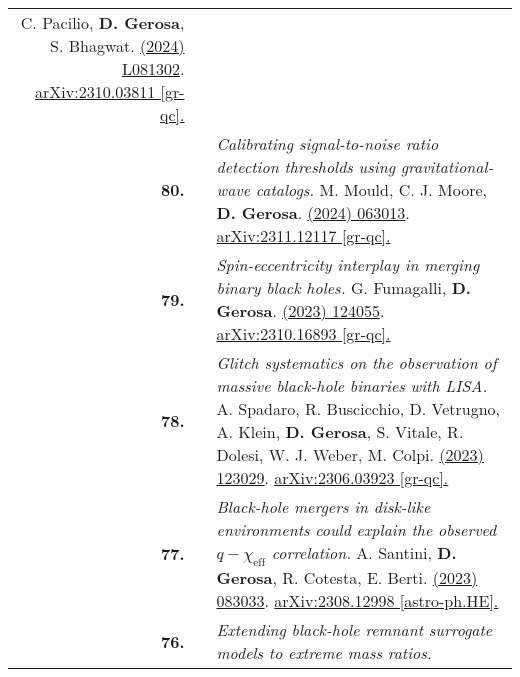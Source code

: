 {\begin{longtable}{rp{0.3cm}p{15.8cm}}
\newline{}
C. Pacilio, \textbf{D. Gerosa}, S. Bhagwat.
\newline{}
\href{https://journals.aps.org/prd/abstract/10.1103/PhysRevD.109.L081302}{\prdl 109 (2024) L081302}. \href{https://arxiv.org/abs/2310.03811}{arXiv:2310.03811 [gr-qc].}
\vspace{0.09cm}\\
%
\textbf{80.} & & \textit{Calibrating signal-to-noise ratio detection thresholds using gravitational-wave catalogs.}
\newline{}
M. Mould, C. J. Moore, \textbf{D. Gerosa}.
\newline{}
\href{https://journals.aps.org/prd/abstract/10.1103/PhysRevD.109.063013}{\prd 109 (2024) 063013}. \href{https://arxiv.org/abs/2311.12117}{arXiv:2311.12117 [gr-qc].}
\vspace{0.09cm}\\
%
\textbf{79.} & & \textit{Spin-eccentricity interplay in merging binary black holes.}
\newline{}
G. Fumagalli, \textbf{D. Gerosa}.
\newline{}
\href{https://journals.aps.org/prd/abstract/10.1103/PhysRevD.108.124055}{\prd 108 (2023) 124055}. \href{https://arxiv.org/abs/2310.16893}{arXiv:2310.16893 [gr-qc].}
\vspace{0.09cm}\\
%
\textbf{78.} & & \textit{Glitch systematics on the observation of massive black-hole binaries with LISA.}
\newline{}
A. Spadaro, R. Buscicchio, D. Vetrugno, A. Klein, \textbf{D. Gerosa}, S. Vitale, R. Dolesi, W. J. Weber, M. Colpi.
\newline{}
\href{https://journals.aps.org/prd/abstract/10.1103/PhysRevD.108.123029}{\prd 108 (2023) 123029}. \href{https://arxiv.org/abs/2306.03923}{arXiv:2306.03923 [gr-qc].}
\vspace{0.09cm}\\
%
\textbf{77.} & & \textit{Black-hole mergers in disk-like environments could explain the observed $q-\chi_\mathrm{eff}$ correlation.}
\newline{}
A. Santini, \textbf{D. Gerosa}, R. Cotesta, E. Berti.
\newline{}
\href{https://journals.aps.org/prd/abstract/10.1103/PhysRevD.108.083033}{\prd 108 (2023) 083033}. \href{https://arxiv.org/abs/2308.12998}{arXiv:2308.12998 [astro-ph.HE].}
\vspace{0.09cm}\\
%
\textbf{76.} & & \textit{Extending black-hole remnant surrogate models to extreme mass ratios.}

\end{longtable}}
